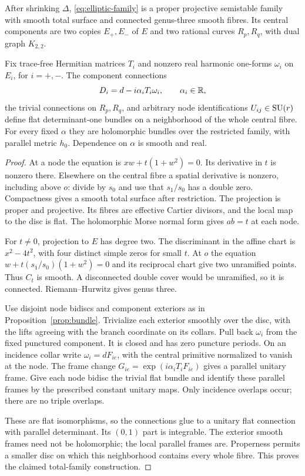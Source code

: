 \begin{proposition}\label{prop:elliptic-family}
After shrinking $\Delta$, \eqref{eq:elliptic-family}
is a proper projective semistable family with
smooth total surface and connected genus-three
smooth fibres. Its central components are two
copies $E_+,E_-$ of $E$ and two rational curves
$R_p,R_q$, with dual graph $K_{2,2}$.

Fix trace-free Hermitian matrices $T_i$ and
nonzero real harmonic one-forms $\omega_i$ on
$E_i$, for $i=+,-$. The component connections
\[
 D_i=d-i\alpha_iT_i\omega_i,\qquad \alpha_i\in\mathbb R,
\]
the trivial connections on $R_p,R_q$, and arbitrary
node identifications $U_{ij}\in\operatorname{SU}(r)$ define
flat determinant-one bundles on a neighborhood
of the whole central fibre. For every fixed
$\alpha$ they are holomorphic bundles over the
restricted family, with parallel metric $h_0$.
Dependence on $\alpha$ is smooth and real.
\end{proposition}
\begin{proof}
At a node the equation is $xw+t(1+w^2)=0$.
Its derivative in $t$ is nonzero there.
Elsewhere on the central fibre a spatial
derivative is nonzero, including above $o$:
divide by $s_0$ and use that $s_1/s_0$ has a
double zero. Compactness gives a smooth total
surface after restriction. The projection is
proper and projective. Its fibres are effective
Cartier divisors, and the local map to the disc
is flat. The holomorphic Morse normal form
gives $ab=t$ at each node.

For $t\ne0$, projection to $E$ has degree two.
The discriminant in the affine chart is
$x^2-4t^2$, with four distinct simple zeros
for small $t$. At $o$ the equation
$w+t(s_1/s_0)(1+w^2)=0$ and its reciprocal
chart give two unramified points.
Thus $C_t$ is smooth. A disconnected
double cover would be unramified, so it is
connected. Riemann--Hurwitz gives genus three.

Use disjoint node bidiscs and component
exteriors as in Proposition~\ref{prop:bundle}.
Trivialize each exterior smoothly over the
disc, with the lifts agreeing with the branch
coordinate on its collars. Pull back
$\omega_i$ from the fixed punctured component.
It is closed and has zero puncture periods.
On an incidence collar write $\omega_i=dF_{ie}$,
with the central primitive normalized to
vanish at the node. The frame change
$G_{ie}=\exp(i\alpha_iT_iF_{ie})$ gives a
parallel unitary frame. Give each node bidisc
the trivial flat bundle and identify these
parallel frames by the prescribed constant
unitary maps. Only incidence overlaps occur;
there are no triple overlaps.

These are flat isomorphisms, so the connections
glue to a unitary flat connection with parallel
determinant. Its $(0,1)$ part is integrable.
The exterior smooth frames need not be
holomorphic; the local parallel frames are.
Properness permits a smaller disc on which
this neighborhood contains every whole fibre.
This proves the claimed total-family construction.
\end{proof}

